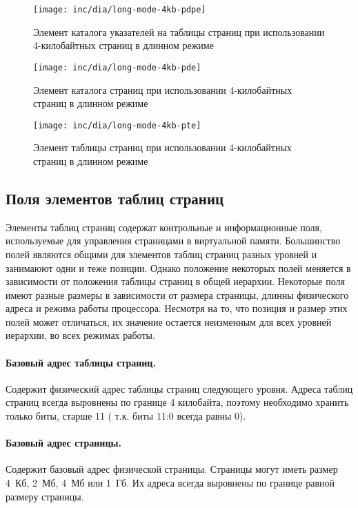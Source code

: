\begin{figure}[ht]
  \centering
  \texttt{[image: inc/dia/long-mode-4kb-pdpe]}
  \caption{Элемент каталога указателей на таблицы страниц при использовании 4-килобайтных страниц в длинном режиме}
  \label{fig:long-mode-4kb-pdpe}
\end{figure}

\begin{figure}[ht]
  \centering
  \texttt{[image: inc/dia/long-mode-4kb-pde]}
  \caption{Элемент каталога страниц при использовании 4-килобайтных страниц в длинном режиме}
  \label{fig:long-mode-4kb-pde}
\end{figure}

\begin{figure}[ht]
  \centering
  \texttt{[image: inc/dia/long-mode-4kb-pte]}
  \caption{Элемент таблицы страниц при использовании 4-килобайтных страниц в длинном режиме}
  \label{fig:long-mode-4kb-pte}
\end{figure}

\subsection{Поля элементов таблиц страниц}
\label{subsec:page_table_fields}
Элементы таблиц страниц содержат контрольные и информационные поля, используемые для управления
страницами в виртуальной памяти. Большинство полей являются общими для элементов таблиц страниц
разных уровней и занимаюют одни и теже позиции. Однако положение некоторых полей меняется в
зависимости от положения таблицы страниц в общей иерархии. Некоторые поля имеют разные размеры
в зависимости от размера страницы, длинны физического адреса и режима работы процессора. Несмотря на
то, что позиция и размер этих полей может отличаться, их значение остается неизменным для всех
уровней иерархии, во всех режимах работы.

\paragraph{Базовый адрес таблицы страниц.} Содержит физический адрес таблицы страниц следующего уровня.
Адреса таблиц страниц всегда выровнены по границе 4 килобайта, поэтому необходимо хранить только биты, старше 11 (
т.к. биты 11:0 всегда равны 0).

\paragraph{Базовый адрес страницы.} Содержит базовый адрес физической страницы. Страницы могут иметь размер 4~Кб, 2~Мб,
4~Мб или 1~Гб. Их адреса всегда выровнены по границе равной размеру страницы.

